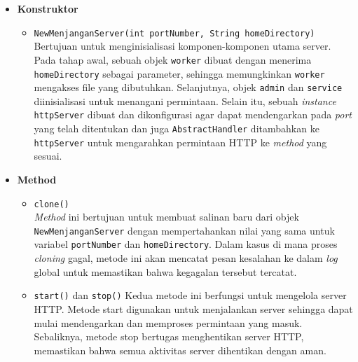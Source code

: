 \begin{itemize}
    \item \textbf{Konstruktor}
    \begin{itemize}
        \item \texttt{NewMenjanganServer(int portNumber, String homeDirectory)}
        \\ Bertujuan untuk menginisialisasi komponen-komponen utama server. Pada tahap awal, sebuah objek \texttt{worker} dibuat dengan menerima \texttt{homeDirectory} sebagai parameter, sehingga memungkinkan \texttt{worker} mengakses file yang dibutuhkan. Selanjutnya, objek \texttt{admin} dan \texttt{service} diinisialisasi untuk menangani permintaan. Selain itu, sebuah \textit{instance} \texttt{httpServer} dibuat dan dikonfigurasi agar dapat mendengarkan pada \textit{port} yang telah ditentukan dan juga \texttt{AbstractHandler} ditambahkan ke \texttt{httpServer} untuk mengarahkan permintaan HTTP ke \textit{method} yang sesuai.
    \end{itemize}

    \item \textbf{Method}
    \begin{itemize}
        \item \texttt{clone()}
        \\ \textit{Method} ini bertujuan untuk membuat salinan baru dari objek \texttt{NewMenjanganServer} dengan mempertahankan nilai yang sama untuk variabel \texttt{portNumber} dan \texttt{homeDirectory}. Dalam kasus di mana proses \textit{cloning} gagal, metode ini akan mencatat pesan kesalahan ke dalam \textit{log} global untuk memastikan bahwa kegagalan tersebut tercatat.
        \item \texttt{start()} dan \texttt{stop()}
        Kedua metode ini berfungsi untuk mengelola server HTTP. Metode start digunakan untuk menjalankan server sehingga dapat mulai mendengarkan dan memproses permintaan yang masuk. Sebaliknya, metode stop bertugas menghentikan server HTTP, memastikan bahwa semua aktivitas server dihentikan dengan aman.
    \end{itemize}
\end{itemize}

